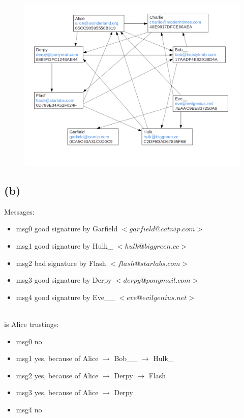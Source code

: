 \documentclass[12pt,pdftex,a4paper]{article}
\begin{document}
\begin{figure}[!ht]
	\centering
	\includegraphics[width=1\linewidth]{problem-2}
\end{figure}


\subsection*{(b)}
Messages:
\begin{itemize}
	\item msg0 good signature by Garfield $ <garfield@catnip.com> $
	\item msg1 good signature by Hulk\_ $ <hulk@biggreen.cc> $
	\item msg2 bad signature by Flash $ <flash@starlabs.com> $
	\item msg3 good signature by Derpy $ <derpy@ponymail.com> $
	\item msg4 good signature by Eve\_\_ $ <eve@evilgenius.net> $
\end{itemize}
\leavevmode
~\\is Alice trustings:
\begin{itemize}
	\item msg0 no
	\item msg1 yes, because of Alice $ \rightarrow $ Bob\_\_ $ \rightarrow $ Hulk\_
	\item msg2 yes, because of Alice $ \rightarrow $ Derpy $ \rightarrow $ Flash
	\item msg3 yes, because of Alice $ \rightarrow $ Derpy
	\item msg4 no
\end{itemize}
\end{document}
